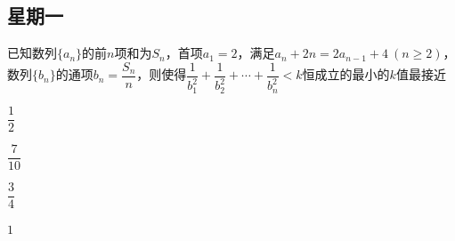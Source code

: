 \documentclass[UTF8,a4paper,11 pt]{ctexart}%
\begin{document}
	\subsection{星期一}\noindent
	已知数列$ \{a_n\} $的前$ n $项和为$ S_n $，首项$ a_1=2 $，满足$ a_n+2n=2a_{n-1}+4\:(n\ge2) $，数列$ \{b_n\} $的通项$ b_n=\dfrac{S_n}{n} $，则使得$ \dfrac{1}{b_1^2}+\dfrac{1}{b_2^2}+\cdots+\dfrac{1}{b_n^2}<k $恒成立的最小的$ k $值最接近\begin{xchoices}[label-style=Alph]
		\item $ \dfrac{1}{2} $
		\item $ \dfrac{7}{10} $
		\item $ \dfrac{3}{4} $
		\item $ 1 $
	\end{xchoices}\\\quad\\\quad\\\quad\\\quad\\\quad\\\quad
\end{document}
